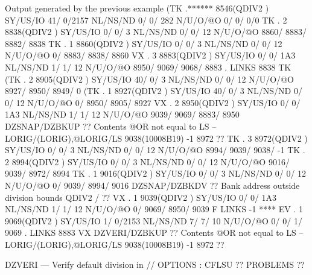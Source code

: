 \begin{landscapebody}
\begin{XMPt}{Output generated by the previous example}
(TK  .******     8546(QDIV2   ) SY/US/IO   41/    0/2157 NL/NS/ND    0/    0/     282 N/U/O/@O       0/       0/       0/0       
 TK  .     2     8838(QDIV2   ) SY/US/IO    0/    0/   3 NL/NS/ND    0/    0/      12 N/U/O/@O    8860/    8883/    8882/    8838
 TK  .     1     8860(QDIV2   ) SY/US/IO    0/    0/   3 NL/NS/ND    0/    0/      12 N/U/O/@O       0/    8883/    8838/    8860
 VX  .     3     8883(QDIV2   ) SY/US/IO    0/    0/ 1A3 NL/NS/ND    1/    1/      12 N/U/O/@O    8950/    9069/    9068/    8883
     . LINKS      8838 TK                                                                                                        
(TK  .     2     8905(QDIV2   ) SY/US/IO   40/    0/   3 NL/NS/ND    0/    0/      12 N/U/O/@O    8927/    8950/    8949/       0
(TK  .     1     8927(QDIV2   ) SY/US/IO   40/    0/   3 NL/NS/ND    0/    0/      12 N/U/O/@O       0/    8950/    8905/    8927
 VX  .     2     8950(QDIV2   ) SY/US/IO    0/    0/ 1A3 NL/NS/ND    1/    1/      12 N/U/O/@O    9039/    9069/    8883/    8950
 DZSNAP/DZBKUP ?? Contents @OR not equal to LS -- LORIG/(LORIG),@LORIG/LS                 9038(10008B19)      -1    8972       ?? 
 TK  .     3     8972(QDIV2   ) SY/US/IO    0/    0/   3 NL/NS/ND    0/    0/      12 N/U/O/@O    8994/    9039/    9038/      -1
 TK  .     2     8994(QDIV2   ) SY/US/IO    0/    0/   3 NL/NS/ND    0/    0/      12 N/U/O/@O    9016/    9039/    8972/    8994
 TK  .     1     9016(QDIV2   ) SY/US/IO    0/    0/   3 NL/NS/ND    0/    0/      12 N/U/O/@O       0/    9039/    8994/    9016
 DZSNAP/DZBKDV ?? Bank address outside division bounds                                QDIV2   /                                ?? 
 VX  .     1     9039(QDIV2   ) SY/US/IO    0/    0/ 1A3 NL/NS/ND    1/    1/      12 N/U/O/@O       0/    9069/    8950/    9039
     F LINKS        -1 ****                                                                                                      
 EV  .     1     9069(QDIV2   ) SY/US/IO    1/    0/2153 NL/NS/ND    7/    7/      10 N/U/O/@O       0/       0/       1/    9069
     . LINKS      8883 VX                                                                                                        
 DZVERI/DZBKUP ?? Contents @OR not equal to LS -- LORIG/(LORIG),@LORIG/LS                 9038(10008B19)      -1    8972       ?? 
                                                                                                                                 
DZVERI --- Verify default division in //                                                           OPTIONS : CFLSU ?? PROBLEMS ??


\end{XMPt}
\end{landscapebody}
